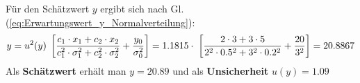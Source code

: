 Für den Schätzwert $y$ ergibt sich nach Gl.(\ref{eq:Erwartungswert_y_Normalverteilung}):
\[
y = u^2(y) \;\left[ \frac{\textstyle c_1\cdot x_1 + c_2\cdot x_2}
{\textstyle c_1^2 \cdot \sigma_1^2 + c_2^2\cdot \sigma_2^2} +\frac{y_0}{\sigma_0^2} \right]
 = 1.1815 \cdot \; \left[\frac{2\cdot 3 + 3\cdot 5}
{2^2 \cdot 0.5^2 + 3^2\cdot 0.2^2} + \frac{20}{3^2} \right] = 20.8867
\]
Als \textbf{Schätzwert} erhält man $y=20.89$ und als \textbf{Unsicherheit} $u(y)= 1.09 $


